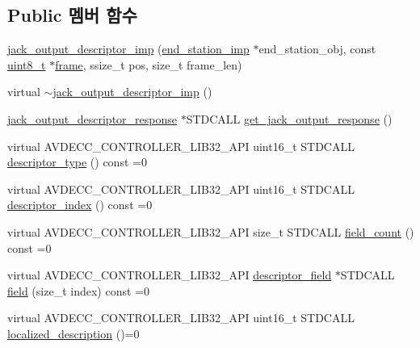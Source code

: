 \subsection*{Public 멤버 함수}
\begin{DoxyCompactItemize}
\item 
\hyperlink{classavdecc__lib_1_1jack__output__descriptor__imp_ac8134352639580104ded34f7bec162e4}{jack\+\_\+output\+\_\+descriptor\+\_\+imp} (\hyperlink{classavdecc__lib_1_1end__station__imp}{end\+\_\+station\+\_\+imp} $\ast$end\+\_\+station\+\_\+obj, const \hyperlink{stdint_8h_aba7bc1797add20fe3efdf37ced1182c5}{uint8\+\_\+t} $\ast$\hyperlink{gst__avb__playbin_8c_ac8e710e0b5e994c0545d75d69868c6f0}{frame}, ssize\+\_\+t pos, size\+\_\+t frame\+\_\+len)
\item 
virtual \hyperlink{classavdecc__lib_1_1jack__output__descriptor__imp_a8f7684a409ae3425d4e6dffff083c484}{$\sim$jack\+\_\+output\+\_\+descriptor\+\_\+imp} ()
\item 
\hyperlink{classavdecc__lib_1_1jack__output__descriptor__response}{jack\+\_\+output\+\_\+descriptor\+\_\+response} $\ast$S\+T\+D\+C\+A\+LL \hyperlink{classavdecc__lib_1_1jack__output__descriptor__imp_ab17cd71f2fd146988ff803f5a77f49e1}{get\+\_\+jack\+\_\+output\+\_\+response} ()
\item 
virtual A\+V\+D\+E\+C\+C\+\_\+\+C\+O\+N\+T\+R\+O\+L\+L\+E\+R\+\_\+\+L\+I\+B32\+\_\+\+A\+PI uint16\+\_\+t S\+T\+D\+C\+A\+LL \hyperlink{classavdecc__lib_1_1descriptor__base_a5112b70022171063ec5d3242bee9910e}{descriptor\+\_\+type} () const =0
\item 
virtual A\+V\+D\+E\+C\+C\+\_\+\+C\+O\+N\+T\+R\+O\+L\+L\+E\+R\+\_\+\+L\+I\+B32\+\_\+\+A\+PI uint16\+\_\+t S\+T\+D\+C\+A\+LL \hyperlink{classavdecc__lib_1_1descriptor__base_a7eed5583bffdf72d89021b188648c1b5}{descriptor\+\_\+index} () const =0
\item 
virtual A\+V\+D\+E\+C\+C\+\_\+\+C\+O\+N\+T\+R\+O\+L\+L\+E\+R\+\_\+\+L\+I\+B32\+\_\+\+A\+PI size\+\_\+t S\+T\+D\+C\+A\+LL \hyperlink{classavdecc__lib_1_1descriptor__base_ab1edf4996377ed957088a7b3b16aca7d}{field\+\_\+count} () const =0
\item 
virtual A\+V\+D\+E\+C\+C\+\_\+\+C\+O\+N\+T\+R\+O\+L\+L\+E\+R\+\_\+\+L\+I\+B32\+\_\+\+A\+PI \hyperlink{classavdecc__lib_1_1descriptor__field}{descriptor\+\_\+field} $\ast$S\+T\+D\+C\+A\+LL \hyperlink{classavdecc__lib_1_1descriptor__base_aa3716832eed0b6f6dcfba358c5d2c601}{field} (size\+\_\+t index) const =0
\item 
virtual A\+V\+D\+E\+C\+C\+\_\+\+C\+O\+N\+T\+R\+O\+L\+L\+E\+R\+\_\+\+L\+I\+B32\+\_\+\+A\+PI uint16\+\_\+t S\+T\+D\+C\+A\+LL \hyperlink{classavdecc__lib_1_1descriptor__base_a1fb9de45567df344090a1407aa6b775f}{localized\+\_\+description} ()=0

\end{DoxyCompactItemize}
